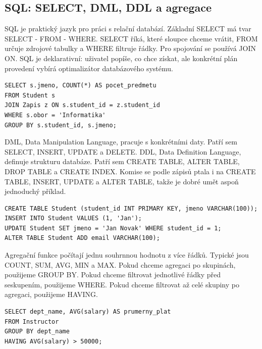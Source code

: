 \documentclass[11pt,a4paper]{article}
\begin{document}
\subsection*{SQL: SELECT, DML, DDL a agregace}

SQL je praktický jazyk pro práci s relační databází. Základní SELECT má tvar SELECT - FROM - WHERE. SELECT říká, které sloupce chceme vrátit, FROM určuje zdrojové tabulky a WHERE filtruje řádky. Pro spojování se používá JOIN ON. SQL je deklarativní: uživatel popíše, co chce získat, ale konkrétní plán provedení vybírá optimalizátor databázového systému.

\begin{codebox}
\small
\begin{verbatim}
SELECT s.jmeno, COUNT(*) AS pocet_predmetu
FROM Student s
JOIN Zapis z ON s.student_id = z.student_id
WHERE s.obor = 'Informatika'
GROUP BY s.student_id, s.jmeno;
\end{verbatim}
\end{codebox}

DML, Data Manipulation Language, pracuje s konkrétními daty. Patří sem SELECT, INSERT, UPDATE a DELETE. DDL, Data Definition Language, definuje strukturu databáze. Patří sem CREATE TABLE, ALTER TABLE, DROP TABLE a CREATE INDEX. Komise se podle zápisů ptala i na CREATE TABLE, INSERT, UPDATE a ALTER TABLE, takže je dobré umět aspoň jednoduchý příklad.

\begin{codebox}
\small
\begin{verbatim}
CREATE TABLE Student (student_id INT PRIMARY KEY, jmeno VARCHAR(100));
INSERT INTO Student VALUES (1, 'Jan');
UPDATE Student SET jmeno = 'Jan Novak' WHERE student_id = 1;
ALTER TABLE Student ADD email VARCHAR(100);
\end{verbatim}
\end{codebox}

Agregační funkce počítají jednu souhrnnou hodnotu z více řádků. Typické jsou COUNT, SUM, AVG, MIN a MAX. Pokud chceme agregaci po skupinách, použijeme GROUP BY. Pokud chceme filtrovat jednotlivé řádky před seskupením, použijeme WHERE. Pokud chceme filtrovat až celé skupiny po agregaci, použijeme HAVING.

\begin{codebox}
\small
\begin{verbatim}
SELECT dept_name, AVG(salary) AS prumerny_plat
FROM Instructor
GROUP BY dept_name
HAVING AVG(salary) > 50000;
\end{verbatim}
\end{codebox}
\end{document}
